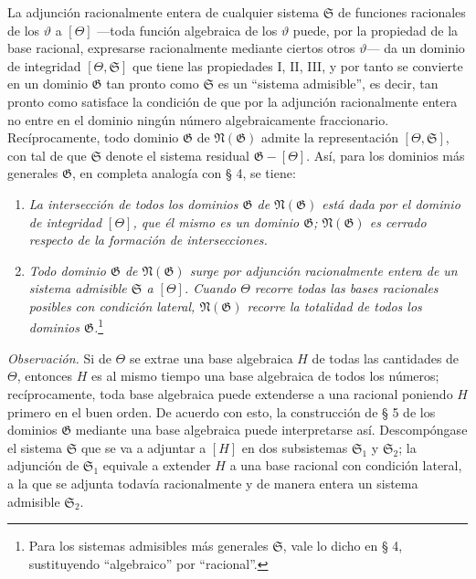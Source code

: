 \documentclass[11pt]{article}
\begin{document}
La adjunción racionalmente entera de cualquier sistema $\mathfrak S$ de funciones racionales de los $\vartheta$ a $[\Theta]$ ---toda función algebraica de los $\vartheta$ puede, por la propiedad de la base racional, expresarse racionalmente mediante ciertos otros $\vartheta$--- da un dominio de integridad $[\Theta,\mathfrak S]$ que tiene las propiedades I, II, III, y por tanto se convierte en un dominio $\mathfrak G$ tan pronto como $\mathfrak S$ es un ``sistema admisible'', es decir, tan pronto como satisface la condición de que por la adjunción racionalmente entera no entre en el dominio ningún número algebraicamente fraccionario. Recíprocamente, todo dominio $\mathfrak G$ de $\mathfrak N(\mathfrak G)$ admite la representación $[\Theta,\mathfrak S]$, con tal de que $\mathfrak S$ denote el sistema residual $\mathfrak G-[\Theta]$. Así, para los dominios más generales $\mathfrak G$, en completa analogía con § 4, se tiene:
\begin{enumerate}
\item[a)] \emph{La intersección de todos los dominios $\mathfrak G$ de $\mathfrak N(\mathfrak G)$ está dada por el dominio de integridad $[\Theta]$, que él mismo es un dominio $\mathfrak G$; $\mathfrak N(\mathfrak G)$ es cerrado respecto de la formación de intersecciones.}
\item[b)] \emph{Todo dominio $\mathfrak G$ de $\mathfrak N(\mathfrak G)$ surge por adjunción racionalmente entera de un sistema admisible $\mathfrak S$ a $[\Theta]$. Cuando $\Theta$ recorre todas las bases racionales posibles con condición lateral, $\mathfrak N(\mathfrak G)$ recorre la totalidad de todos los dominios $\mathfrak G$.}\footnote{Para los sistemas admisibles más generales $\mathfrak S$, vale lo dicho en § 4, sustituyendo ``algebraico'' por ``racional''.}
\end{enumerate}

\emph{Observación.} Si de $\Theta$ se extrae una base algebraica $H$ de todas las cantidades de $\Theta$, entonces $H$ es al mismo tiempo una base algebraica de todos los números; recíprocamente, toda base algebraica puede extenderse a una racional poniendo $H$ primero en el buen orden. De acuerdo con esto, la construcción de § 5 de los dominios $\mathfrak G$ mediante una base algebraica puede interpretarse así. Descompóngase el sistema $\mathfrak S$ que se va a adjuntar a $[H]$ en dos subsistemas $\mathfrak S_1$ y $\mathfrak S_2$; la adjunción de $\mathfrak S_1$ equivale a extender $H$ a una base racional con condición lateral, a la que se adjunta todavía racionalmente y de manera entera un sistema admisible $\mathfrak S_2$.
\end{document}
